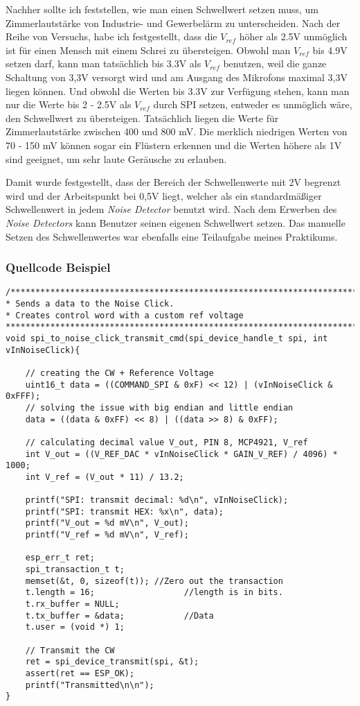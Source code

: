 Nachher sollte ich feststellen, wie man einen Schwellwert setzen muss, um Zimmerlautstärke von Industrie- und Gewerbelärm zu unterscheiden. Nach der Reihe von Versuchs, habe ich festgestellt, dass die $V_{ref}$ höher als 2.5V unmöglich ist für einen Mensch mit einem Schrei zu übersteigen. Obwohl man $V_{ref}$ bis 4.9V setzen darf, kann man tatsächlich bis 3.3V als $V_{ref}$ benutzen, weil die ganze Schaltung von 3,3V versorgt wird und am Ausgang des Mikrofons maximal 3,3V liegen können. Und obwohl die Werten bis 3.3V zur Verfügung stehen, kann man nur die Werte bis 2 - 2.5V als $V_{ref}$ durch SPI setzen, entweder es unmöglich wäre, den Schwellwert zu übersteigen. Tatsächlich liegen die Werte für Zimmerlautstärke zwischen 400 und 800 mV. Die merklich niedrigen Werten von 70 - 150 mV können sogar ein Flüstern erkennen und die Werten höhere als 1V sind geeignet, um sehr laute Geräusche zu erlauben.   

Damit wurde festgestellt, dass der Bereich der Schwellenwerte mit 2V begrenzt wird und der Arbeitspunkt bei 0,5V liegt, welcher als ein standardmäßiger Schwellenwert in jedem \textit{Noise Detector} benutzt wird. Nach dem Erwerben des \textit{Noise Detectors} kann Benutzer seinen eigenen Schwellwert setzen. Das manuelle Setzen des Schwellenwertes war ebenfalls eine Teilaufgabe meines Praktikums.

\subsubsection{Quellcode Beispiel}
\begin{lstlisting}
/***************************************************************************
* Sends a data to the Noise Click.
* Creates control word with a custom ref voltage
***************************************************************************/
void spi_to_noise_click_transmit_cmd(spi_device_handle_t spi, int vInNoiseClick){
	
	// creating the CW + Reference Voltage
	uint16_t data = ((COMMAND_SPI & 0xF) << 12) | (vInNoiseClick & 0xFFF);
	// solving the issue with big endian and little endian
	data = ((data & 0xFF) << 8) | ((data >> 8) & 0xFF);
	
	// calculating decimal value V_out, PIN 8, MCP4921, V_ref
	int V_out = ((V_REF_DAC * vInNoiseClick * GAIN_V_REF) / 4096) * 1000;
	int V_ref = (V_out * 11) / 13.2;
	
	printf("SPI: transmit decimal: %d\n", vInNoiseClick);
	printf("SPI: transmit HEX: %x\n", data);
	printf("V_out = %d mV\n", V_out);
	printf("V_ref = %d mV\n", V_ref);
	
	esp_err_t ret;
	spi_transaction_t t;
	memset(&t, 0, sizeof(t)); //Zero out the transaction
	t.length = 16;                  //length is in bits.
	t.rx_buffer = NULL;
	t.tx_buffer = &data;            //Data
	t.user = (void *) 1;
	
	// Transmit the CW
	ret = spi_device_transmit(spi, &t);
	assert(ret == ESP_OK);
	printf("Transmitted\n\n");
}
\end{lstlisting}

